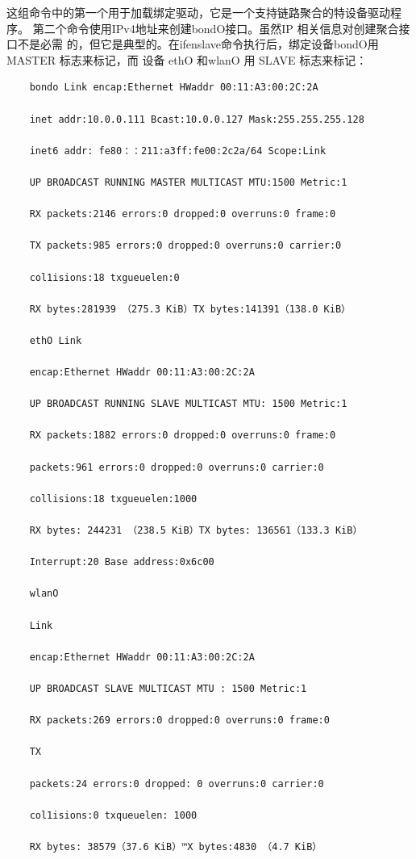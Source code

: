 这组命令中的第一个用于加载绑定驱动，它是一个支持链路聚合的特设备驱动程序。
第二个命令使用IPv4地址来创建bondO接口。虽然IP 相关信息对创建聚合接口不是必需
的，但它是典型的。在ifenslave命令执行后，绑定设备bondO用MASTER 标志来标记，而
设备 ethO 和wlanO 用 SLAVE 标志来标记：
\begin{verbatim}
    bondo Link encap:Ethernet HWaddr 00:11:A3:00:2C:2A
    
    inet addr:10.0.0.111 Bcast:10.0.0.127 Mask:255.255.255.128
    
    inet6 addr: fe80：：211:a3ff:fe00:2c2a/64 Scope:Link
    
    UP BROADCAST RUNNING MASTER MULTICAST MTU:1500 Metric:1
    
    RX packets:2146 errors:0 dropped:0 overruns:0 frame:0
    
    TX packets:985 errors:0 dropped:0 overruns:0 carrier:0
    
    col1isions:18 txgueuelen:0
    
    RX bytes:281939 （275.3 KiB）TX bytes:141391（138.0 KiB）
    
    ethO Link
    
    encap:Ethernet HWaddr 00:11:A3:00:2C:2A
    
    UP BROADCAST RUNNING SLAVE MULTICAST MTU: 1500 Metric:1
    
    RX packets:1882 errors:0 dropped:0 overruns:0 frame:0
    
    packets:961 errors:0 dropped:0 overruns:0 carrier:0
    
    collisions:18 txgueuelen:1000
    
    RX bytes: 244231 （238.5 KiB）TX bytes: 136561（133.3 KiB）
    
    Interrupt:20 Base address:0x6c00
    
    wlanO
    
    Link
    
    encap:Ethernet HWaddr 00:11:A3:00:2C:2A
    
    UP BROADCAST SLAVE MULTICAST MTU : 1500 Metric:1
    
    RX packets:269 errors:0 dropped:0 overruns:0 frame:0
    
    TX
    
    packets:24 errors:0 dropped: 0 overruns:0 carrier:0
    
    col1isions:0 txqueuelen: 1000
    
    RX bytes: 38579（37.6 KiB）™X bytes:4830 （4.7 KiB）
\end{verbatim}

